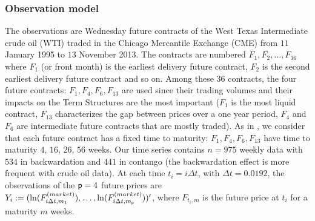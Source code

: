 \subsubsection*{Observation model}
The observations are Wednesday future contracts of the West Texas Intermediate crude oil (WTI) traded in the Chicago Mercantile Exchange (CME) from $11$ January 1995 to $13$ November 2013. The contracts are numbered $F_1, F_2, \ldots, F_{36}$ where $F_1$ (or front month) is the earliest delivery future contract, $F_2$ is the second earliest delivery future contract and so on. Among these $36$ contracts, the four future contracts: $F_1, F_4, F_6, F_{13}$ are used since their trading volumes and their impacts on the Term Structures are the most important ($F_1$ is the most liquid contract, $F_{13}$ characterizes the gap between prices over a one year period, $F_4$ and $F_6$ are intermediate future contracts that are mostly traded). As in \cite{almansour:2016}, we consider that each  future contract has a fixed time to maturity: $F_1, F_4, F_6, F_{13}$ have time to  maturity $4$, $16$, $26$, $56$ weeks.  Our time series contains $n =975$ weekly data with $534$ in backwardation and $441$ in contango (the backwardation effect is more frequent with crude oil data). At each time $t_i = i\Delta t$, with $\Delta t = 0.0192$, the observations of the $\mathsf{p} = 4$ future prices are $Y_i := (\ln(F^{(market)}_{i\Delta t,m_1}), \ldots, \ln(F^{(market)}_{i\Delta t,m_{\mathsf{p}}}))'$, where $F_{t_i,m}$ is the future price at $t_i$ for a maturity  $m$ weeks.

